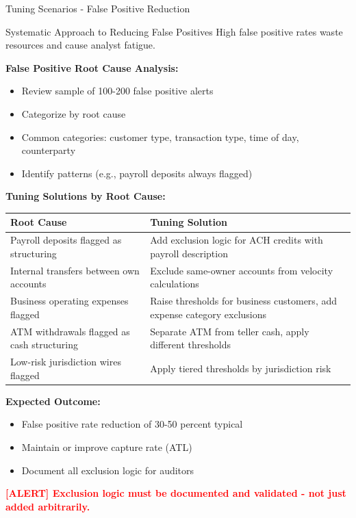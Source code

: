\documentclass[11pt,a4paper]{beamer}
\newcommand{\redflag}[1]{\textcolor{red}{\textbf{[ALERT] #1}}}
\begin{document}
	\begin{frame}{Tuning Scenarios - False Positive Reduction}
		\begin{block}{Systematic Approach to Reducing False Positives}
			High false positive rates waste resources and cause analyst fatigue.
		\end{block}
		
		\textbf{False Positive Root Cause Analysis:}
		\begin{itemize}
			\item Review sample of 100-200 false positive alerts
			\item Categorize by root cause
			\item Common categories: customer type, transaction type, time of day, counterparty
			\item Identify patterns (e.g., payroll deposits always flagged)
		\end{itemize}
		
		\textbf{Tuning Solutions by Root Cause:}
		\begin{longtable}{p{}|p{}}
			\hline
			\rowcolor{lightgray}
			\textbf{Root Cause} & \textbf{Tuning Solution} \\
			\hline
			Payroll deposits flagged as structuring & Add exclusion logic for ACH credits with payroll description \\
			\hline
			Internal transfers between own accounts & Exclude same-owner accounts from velocity calculations \\
			\hline
			Business operating expenses flagged & Raise thresholds for business customers, add expense category exclusions \\
			\hline
			ATM withdrawals flagged as cash structuring & Separate ATM from teller cash, apply different thresholds \\
			\hline
			Low-risk jurisdiction wires flagged & Apply tiered thresholds by jurisdiction risk \\
			\hline
		\end{longtable}
		
		\textbf{Expected Outcome:}
		\begin{itemize}
			\item False positive rate reduction of 30-50 percent typical
			\item Maintain or improve capture rate (ATL)
			\item Document all exclusion logic for auditors
		\end{itemize}
		
		\redflag{Exclusion logic must be documented and validated - not just added arbitrarily.}
	\end{frame}
	
\end{document}
